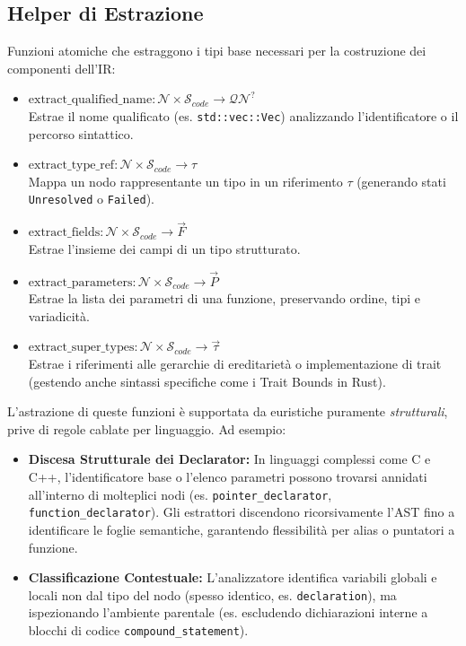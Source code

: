 \subsection{Helper di Estrazione}
Funzioni atomiche che estraggono i tipi base necessari per la
costruzione dei componenti dell'IR:
\begin{itemize}
  \item $\text{extract\_qualified\_name} : \mathcal{N} \times
    \mathcal{S}_{code} \to \mathcal{QN}^?$ \\
    Estrae il nome qualificato (es. \texttt{std::vec::Vec})
    analizzando l'identificatore o il percorso sintattico.
  \item $\text{extract\_type\_ref} : \mathcal{N} \times
    \mathcal{S}_{code} \to \tau$ \\
    Mappa un nodo rappresentante un tipo in un riferimento $\tau$
    (generando stati \texttt{Unresolved} o \texttt{Failed}).
  \item $\text{extract\_fields} : \mathcal{N} \times
    \mathcal{S}_{code} \to \vec{F}$ \\
    Estrae l'insieme dei campi di un tipo strutturato.
  \item $\text{extract\_parameters} : \mathcal{N} \times
    \mathcal{S}_{code} \to \vec{P}$ \\
    Estrae la lista dei parametri di una funzione, preservando
    ordine, tipi e variadicità.
    \item $\text{extract\_super\_types} : \mathcal{N} \times
    \mathcal{S}_{code} \to \vec{\tau}$ \\
    Estrae i riferimenti alle gerarchie di ereditarietà o
    implementazione di trait (gestendo anche sintassi specifiche come
    i Trait Bounds in Rust).
\end{itemize}

L'astrazione di queste funzioni è supportata da euristiche puramente \textit{strutturali}, prive di regole cablate per linguaggio. Ad esempio:
\begin{itemize}
    \item \textbf{Discesa Strutturale dei Declarator:} In linguaggi complessi come C e C++, l'identificatore base o l'elenco parametri possono trovarsi annidati all'interno di molteplici nodi (es. \texttt{pointer\_declarator}, \texttt{function\_declarator}). Gli estrattori discendono ricorsivamente l'AST fino a identificare le foglie semantiche, garantendo flessibilità per alias o puntatori a funzione.
    \item \textbf{Classificazione Contestuale:} L'analizzatore identifica variabili globali e locali non dal tipo del nodo (spesso identico, es. \texttt{declaration}), ma ispezionando l'ambiente parentale (es. escludendo dichiarazioni interne a blocchi di codice \texttt{compound\_statement}).
\end{itemize}

